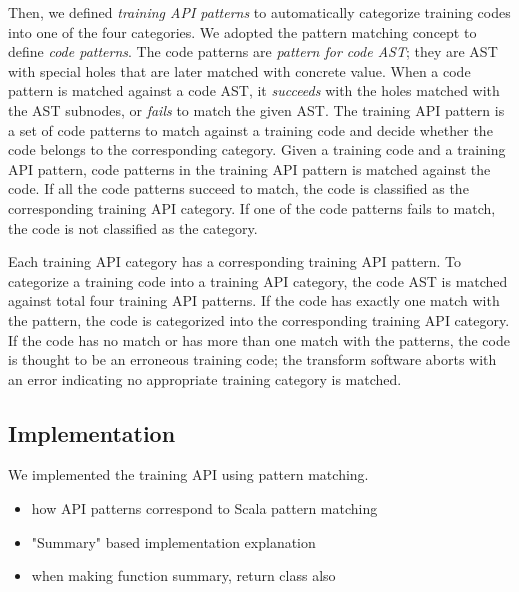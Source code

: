 Then, we defined \textit{training API patterns} to automatically
categorize training codes into one of the four categories.
We adopted the pattern matching concept to define \textit{code patterns}.
The code patterns are \textit{pattern for code AST}; they are AST with
special holes that are later matched with concrete value.
When a code pattern is matched against a code AST,
it \textit{succeeds} with the holes matched with the AST subnodes,
or \textit{fails} to match the given AST.
The training API pattern is a set of code patterns
to match against a training code and decide whether the code belongs to
the corresponding category.
Given a training code and a training API pattern,
code patterns in the training API pattern is matched against the code. 
If all the code patterns succeed to match, the code is classified as 
the corresponding training API category.
If one of the code patterns fails to match, the code is not classified
as the category.

Each training API category has a corresponding training API pattern.
To categorize a training code into a training API category,
the code AST is matched against total four training API patterns.
If the code has exactly one match with the pattern,
the code is categorized into the corresponding training API category.
If the code has no match or has more than one match with the patterns, 
the code is thought to be an erroneous training code; 
the transform software aborts with an error indicating
no appropriate training category is matched.


\subsection{Implementation}

We implemented the training API using pattern matching.

\begin{itemize}
  \item how API patterns correspond to Scala pattern matching
  \item "Summary" based implementation explanation 
  \item when making function summary, return class also
\end{itemize}
